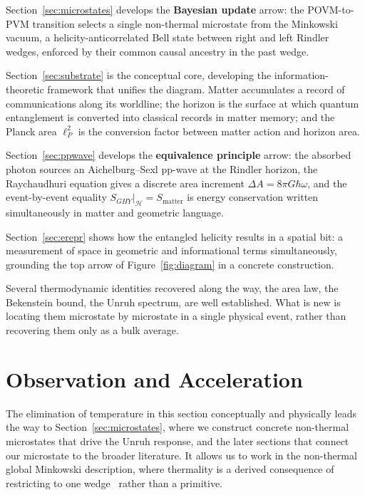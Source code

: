 \documentclass[12pt,a4paper]{article}
\begin{document}
Section~\ref{sec:microstates} develops the 
\textbf{Bayesian update} arrow: the POVM-to-PVM 
transition selects a single non-thermal microstate 
from the Minkowski vacuum, a helicity-anticorrelated 
Bell state between right and left Rindler wedges, 
enforced by their common causal ancestry in the past 
wedge.

Section~\ref{sec:substrate} is the conceptual core, 
developing the information-theoretic framework that 
unifies the diagram. Matter accumulates a record 
of communications along its worldline; the horizon is 
the surface at which quantum entanglement is converted 
into classical records in matter memory; and the 
Planck area $\ell_P^2$ is the conversion factor 
between matter action and horizon area.

Section~\ref{sec:ppwave} develops the 
\textbf{equivalence principle} arrow: the absorbed 
photon sources an Aichelburg--Sexl pp-wave at the 
Rindler horizon, the Raychaudhuri equation gives a 
discrete area increment $\Delta A = 8\pi G\hbar\omega$, 
and the event-by-event equality 
$S_{GHY}|_{\mathcal{H}} = S_{\mathrm{matter}}$ is 
energy conservation written simultaneously in matter 
and geometric language.

Section~\ref{sec:erepr} shows how the entangled 
helicity results in a spatial bit: a measurement of 
space in geometric and informational terms 
simultaneously, grounding the top arrow of 
Figure~\ref{fig:diagram} in a concrete construction.

Several thermodynamic identities recovered along the 
way, the area law, the Bekenstein bound, the Unruh 
spectrum, are well established. What is new is 
locating them microstate by microstate in a single 
physical event, rather than recovering them only as 
a bulk average.


\section{Observation and Acceleration}
\label{sec:obs_accel}

The elimination of temperature in this section 
conceptually and physically leads the way to 
Section~\ref{sec:microstates}, where we construct 
concrete non-thermal microstates that drive the Unruh 
response, and the later sections that connect our 
microstate to the broader literature. It allows us to 
work in the non-thermal global Minkowski description, 
where thermality is a derived consequence of restricting 
to one wedge~\cite{fulling1973nonuniqueness, 
bisognano1975duality} rather than a primitive.
\end{document}

